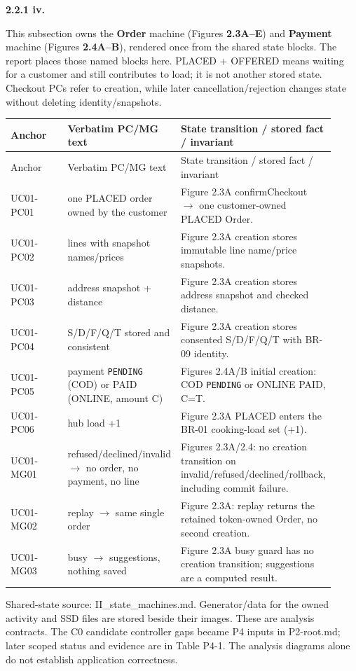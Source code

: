 \textbf{2.2.1 iv.}\par
This subsection owns the \textbf{Order} machine (Figures \textbf{2.3A--E}) and \textbf{Payment} machine (Figures \textbf{2.4A--B}), rendered once from the shared state blocks. The report places those named blocks here. PLACED + OFFERED means waiting for a customer and still contributes to load; it is not another stored state. Checkout PCs refer to creation, while later cancellation/rejection changes state without deleting identity/snapshots.

\begin{longtable}{>{\raggedright\arraybackslash}p{0.3067\linewidth}>{\raggedright\arraybackslash}p{0.3067\linewidth}>{\raggedright\arraybackslash}p{0.3067\linewidth}}
Anchor & Verbatim PC/MG text & State transition / stored fact / invariant \\
\hline\endfirsthead
Anchor & Verbatim PC/MG text & State transition / stored fact / invariant \\
\hline\endhead
UC01-PC01 & one PLACED order owned by the customer & Figure 2.3A confirmCheckout \ensuremath{\rightarrow} one customer-owned PLACED Order. \\
UC01-PC02 & lines with snapshot names/prices & Figure 2.3A creation stores immutable line name/price snapshots. \\
UC01-PC03 & address snapshot + distance & Figure 2.3A creation stores address snapshot and checked distance. \\
UC01-PC04 & S/D/F/Q/T stored and consistent & Figure 2.3A creation stores consented S/D/F/Q/T with BR-09 identity. \\
UC01-PC05 & payment \texttt{PENDING} (COD) or PAID (ONLINE, amount C) & Figures 2.4A/B initial creation: COD \texttt{PENDING} or ONLINE PAID, C=T. \\
UC01-PC06 & hub load +1 & Figure 2.3A PLACED enters the BR-01 cooking-load set (+1). \\
UC01-MG01 & refused/declined/invalid \ensuremath{\rightarrow} no order, no payment, no line & Figures 2.3A/2.4: no creation transition on invalid/refused/declined/rollback, including commit failure. \\
UC01-MG02 & replay \ensuremath{\rightarrow} same single order & Figure 2.3A: replay returns the retained token-owned Order, no second creation. \\
UC01-MG03 & busy \ensuremath{\rightarrow} suggestions, nothing saved & Figure 2.3A busy guard has no creation transition; suggestions are a computed result. \\
\end{longtable}
Shared-state source: II\_state\_machines.md. Generator/data for the owned activity and SSD files are stored beside their images. These are analysis contracts. The C0 candidate controller gaps became P4 inputs in P2-root.md; later scoped status and evidence are in Table P4-1. The analysis diagrams alone do not establish application correctness.

